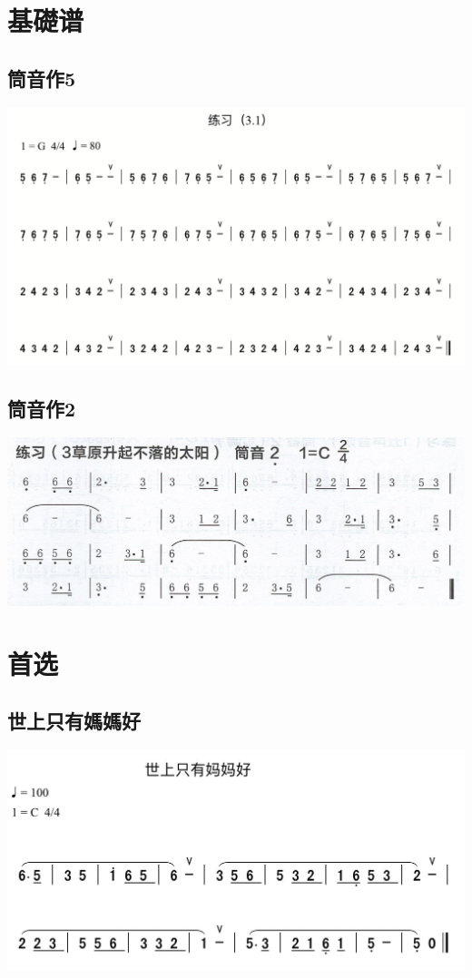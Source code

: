 \documentclass[cn,pad,twocol]{elegantbook}
\begin{document}
\chapter{基礎谱}
\section{筒音作5}
\begin{center}
	\includegraphics[width=\textwidth]{dongxiao/20200419-练习3.1.png}
\end{center}
\section{筒音作2}
	\includegraphics[width=\textwidth]{dongxiao/Scan 6.jpeg}

\chapter{首选}
\section{世上只有媽媽好}        \includegraphics[width=\textwidth]{dongxiao/IMG_0854-世上只有妈妈好.png}
\end{document}
